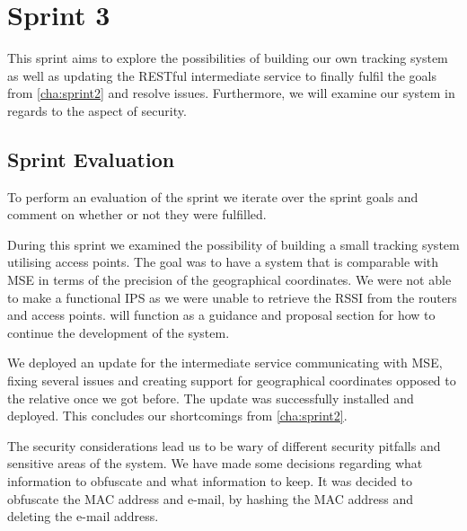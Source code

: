 \chapter{Sprint 3}\label{cha:sprint3}
This sprint aims to explore the possibilities of building our own tracking system as well as updating the RESTful intermediate service to finally fulfil the goals from \cref{cha:sprint2} and resolve issues. Furthermore, we will examine our system in regards to the aspect of security.





\section{Sprint Evaluation}
To perform an evaluation of the sprint we iterate over the sprint goals and comment on whether or not they were fulfilled.

During this sprint we examined the possibility of building a small tracking system utilising access points. The goal was to have a system that is comparable with MSE in terms of the precision of the geographical coordinates. We were not able to make a functional IPS as we were unable to retrieve the RSSI from the routers and access points.  will function as a guidance and proposal section for how to continue the development of the system.

We deployed an update for the intermediate service communicating with MSE, fixing several issues and creating support for geographical coordinates opposed to the relative once we got before. The update was successfully installed and deployed. This concludes our shortcomings from \cref{cha:sprint2}.

The security considerations lead us to be wary of different security pitfalls and sensitive areas of the system. We have made some decisions regarding what information to obfuscate and what information to keep. It was decided to obfuscate the MAC address and e-mail, by hashing the MAC address and deleting the e-mail address.